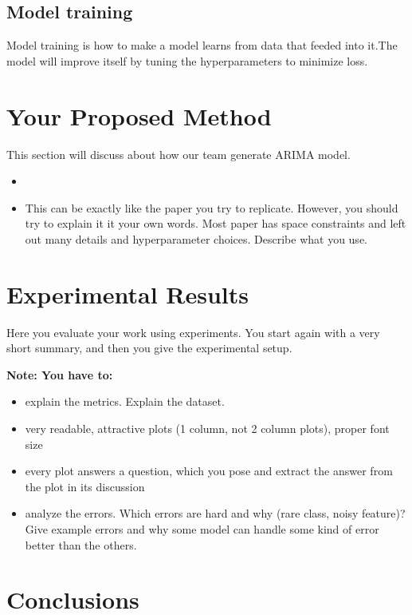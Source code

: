 \documentclass{article}
\begin{document}
\subsection{Model training}
Model training is how to make a model learns from data that feeded into it.The model will improve itself by tuning the hyperparameters to minimize loss.

\section{Your Proposed Method}\label{sec:yourmethod}

This section will discuss about how our team generate ARIMA model.

\begin{itemize}
\item 
\item This can be exactly like the paper you try to replicate. However, you should try to explain it it your own words. Most paper has space constraints and left out many details and hyperparameter choices. Describe what you use.
\end{itemize}


\section{Experimental Results}
\label{sec:exp}

Here you evaluate your work using experiments.  You start again with a very short summary, and then you
give the experimental setup. 

{\bf Note: You have to:}
\begin{itemize}
\item explain the metrics. Explain the dataset.
\item very readable, attractive plots (1 column, not 2 column plots),
proper font size
\item every plot answers a question, which you pose and extract the
answer from the plot in its discussion
\item analyze the errors. Which errors are hard and why (rare class, noisy feature)? Give example errors and why some model can handle some kind of error better than the others.
\end{itemize}

\section{Conclusions}
\label{sec:conclusion}
\end{document}
